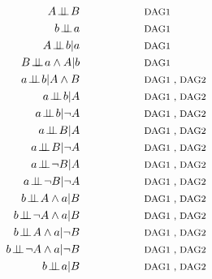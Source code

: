 \documentclass[
  10pt,
  dvipsnames,enabledeprecatedfontcommands]{scrartcl}
\newcommand{\indep}{\!\perp \!\!\! \perp\!}
\newcommand{\n}{\neg}
\newcommand{\et}{\wedge}
\begin{document}
\begin{align} A\indep B  \label{eq:indAB}     &\hspace{2cm}\mbox{\footnotesize DAG1}\\
b \indep a   \label{eq:indab}   & \hspace{2cm}\mbox{\footnotesize DAG1}\\
A \indep b \vert a   \label{eq:I1}    &\hspace{2cm}\mbox{\footnotesize DAG1} \\
B \indep a \et A \vert b \label{eq:I2}&\hspace{2cm}\mbox{\footnotesize DAG1 } \\
a\indep b \vert A\et B \label{eq:I3}  &\hspace{2cm}\mbox{\footnotesize DAG1 , DAG2} \\  
a\indep b \vert A \label{eq:I3a}   &\hspace{2cm}\mbox{\footnotesize DAG1 , DAG2} \\ 
a\indep b \vert \n A \label{eq:I3b}   &\hspace{2cm}\mbox{\footnotesize DAG1 , DAG2} \\ 
a\indep B \vert A \label{eq:I4}    & \hspace{2cm}\mbox{\footnotesize DAG1 , DAG2} \\
a\indep B \vert \n A \label{eq:I4a}    & \hspace{2cm}\mbox{\footnotesize DAG1 , DAG2} \\
a\indep \n B \vert A \label{eq:I4b}   & \hspace{2cm}\mbox{\footnotesize DAG1 , DAG2} \\
a\indep \n B \vert \n A \label{eq:I4c}   & \hspace{2cm}\mbox{\footnotesize DAG1 , DAG2} \\
b\indep A \et a \vert B \label{eq:I5}  & \hspace{2cm}\mbox{\footnotesize DAG1 , DAG2} \\
b\indep \n A \et a \vert B \label{eq:I5a} &\hspace{2cm}\mbox{\footnotesize DAG1 , DAG2}  \\
b\indep A \et a \vert \n B \label{eq:I5b} & \hspace{2cm}\mbox{\footnotesize DAG1 , DAG2} \\
b\indep \n A \et a \vert \n B \label{eq:I5c} & \hspace{2cm}\mbox{\footnotesize DAG1 , DAG2} \\
b \indep a \vert B \label{eq:I6} & \hspace{2cm}\mbox{\footnotesize DAG1 , DAG2} 
\end{align}
\end{document}
